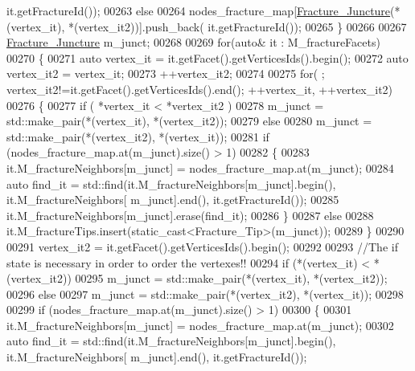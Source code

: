 \begin{DoxyCode}
      it.getFractureId());
00263         \textcolor{keywordflow}{else}
00264             nodes\_fracture\_map[\hyperlink{classFVCode3D_1_1Rigid__Mesh_a7c7beee55763889ef7a4d0bc48392084}{Fracture\_Juncture}(*(vertex\_it), *(vertex\_it2))].push\_back(
      it.getFractureId());
00265     \}
00266 
00267     \hyperlink{classFVCode3D_1_1Rigid__Mesh_a7c7beee55763889ef7a4d0bc48392084}{Fracture\_Juncture} m\_junct;
00268 
00269     \textcolor{keywordflow}{for}(\textcolor{keyword}{auto}& it : M\_fractureFacets)
00270     \{
00271         \textcolor{keyword}{auto} vertex\_it  = it.getFacet().getVerticesIds().begin();
00272         \textcolor{keyword}{auto} vertex\_it2 = vertex\_it;
00273         ++vertex\_it2;
00274 
00275         \textcolor{keywordflow}{for}( ; vertex\_it2!=it.getFacet().getVerticesIds().end(); ++vertex\_it, ++vertex\_it2)
00276         \{
00277             \textcolor{keywordflow}{if} ( *vertex\_it < *vertex\_it2 )
00278                 m\_junct = std::make\_pair(*(vertex\_it), *(vertex\_it2));
00279             \textcolor{keywordflow}{else}
00280                 m\_junct = std::make\_pair(*(vertex\_it2), *(vertex\_it));
00281             \textcolor{keywordflow}{if} (nodes\_fracture\_map.at(m\_junct).size() > 1)
00282             \{
00283                 it.M\_fractureNeighbors[m\_junct] = nodes\_fracture\_map.at(m\_junct);
00284                 \textcolor{keyword}{auto} find\_it = std::find(it.M\_fractureNeighbors[m\_junct].begin(), it.M\_fractureNeighbors[
      m\_junct].end(), it.getFractureId());
00285                 it.M\_fractureNeighbors[m\_junct].erase(find\_it);
00286             \}
00287             \textcolor{keywordflow}{else}
00288                 it.M\_fractureTips.insert(static\_cast<Fracture\_Tip>(m\_junct));
00289         \}
00290 
00291         vertex\_it2 = it.getFacet().getVerticesIds().begin();
00292 
00293         \textcolor{comment}{//The if state is necessary in order to order the vertexes!!}
00294         \textcolor{keywordflow}{if} (*(vertex\_it) < *(vertex\_it2))
00295             m\_junct = std::make\_pair(*(vertex\_it), *(vertex\_it2));
00296         \textcolor{keywordflow}{else}
00297             m\_junct = std::make\_pair(*(vertex\_it2), *(vertex\_it));
00298 
00299         \textcolor{keywordflow}{if} (nodes\_fracture\_map.at(m\_junct).size() > 1)
00300         \{
00301             it.M\_fractureNeighbors[m\_junct] = nodes\_fracture\_map.at(m\_junct);
00302             \textcolor{keyword}{auto} find\_it = std::find(it.M\_fractureNeighbors[m\_junct].begin(), it.M\_fractureNeighbors[
      m\_junct].end(), it.getFractureId());

\end{DoxyCode}
